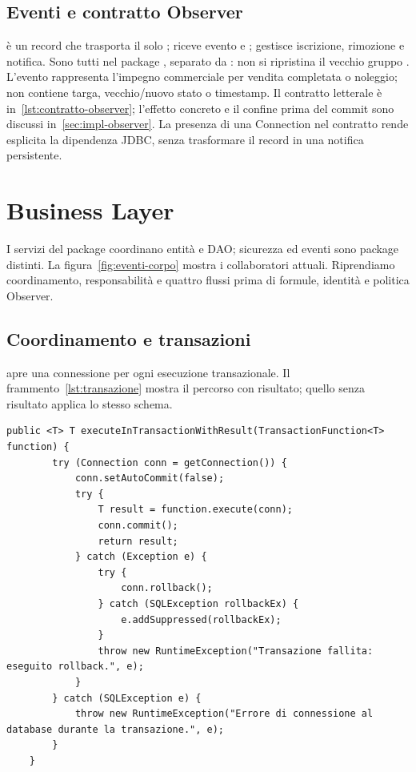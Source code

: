 {\raggedright
\subsection{Eventi e contratto Observer}
 è un record che trasporta il solo
;  riceve evento e
;  gestisce iscrizione,
rimozione e notifica. Sono tutti nel package , separato da
: non si ripristina il vecchio gruppo .
L'evento rappresenta l'impegno commerciale per vendita completata o
noleggio; non contiene targa, vecchio/nuovo stato o timestamp.
Il contratto letterale è in~\ref{lst:contratto-observer}; l'effetto
concreto e il confine prima del commit sono discussi
in~\ref{sec:impl-observer}. La presenza di una Connection nel contratto
rende esplicita la dipendenza JDBC, senza trasformare il record in una
notifica persistente.\par}


\section{Business Layer}\label{sec:impl-business}
I servizi del package  coordinano entità e DAO; sicurezza
ed eventi sono package distinti. La figura~\ref{fig:eventi-corpo} mostra
i collaboratori attuali. Riprendiamo coordinamento, responsabilità e
quattro flussi prima di formule, identità e politica Observer.

\subsection{Coordinamento e transazioni}\label{sec:impl-transazioni}
 apre una connessione per ogni esecuzione
transazionale. Il frammento~\ref{lst:transazione} mostra il percorso con
risultato; quello senza risultato applica lo stesso schema.

\noindent\begin{minipage}{\linewidth}
\begin{lstlisting}[firstnumber=88,caption={\code{DatabaseManager.java}: commit, tentativo di rollback e conservazione delle cause.},
  label=lst:transazione]
    public <T> T executeInTransactionWithResult(TransactionFunction<T> function) {
        try (Connection conn = getConnection()) {
            conn.setAutoCommit(false);
            try {
                T result = function.execute(conn);
                conn.commit();
                return result;
            } catch (Exception e) {
                try {
                    conn.rollback();
                } catch (SQLException rollbackEx) {
                    e.addSuppressed(rollbackEx);
                }
                throw new RuntimeException("Transazione fallita: eseguito rollback.", e);
            }
        } catch (SQLException e) {
            throw new RuntimeException("Errore di connessione al database durante la transazione.", e);
        }
    }
\end{lstlisting}
\end{minipage}


